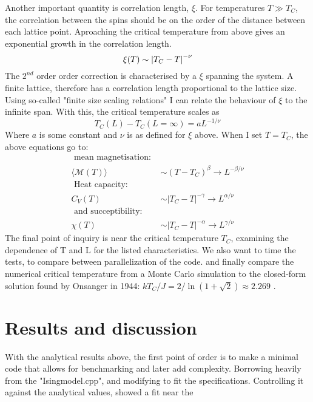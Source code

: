 \documentclass[10pt, twocolumn]{revtex4-1}
\begin{document}
Another important quantity is correlation length, $\xi$. For temperatures $T \gg T_C$, the correlation between the spins should be on the order of the
distance between each lattice point. Aproaching the critical temperature from above gives an exponential
growth in the correlation length.
\[ \xi(T) \sim \qty| T_C - T |^{-\nu} \]
The $2^{nd}$ order order correction is characterised by a $\xi$ spanning the system. A finite lattice, therefore has a correlation length proportional to
the lattice size. Using so-called "finite size scaling relations" I can relate the behaviour of $\xi$ to the infinite span. With this, the critical
temperature scales as
\[ T _ { C } ( L ) - T _ { C } ( L = \infty ) = a L ^ { - 1 / \nu } \]
Where $a$ is some constant and $\nu$ is as defined for $\xi$ above. When I set $T = T_C$, the above equations go to:
\begin{align*}
    \text{ mean magnetisation: } \\
    \langle \mathcal { M } ( T ) \rangle &\sim \left( T - T _ { C } \right) ^ { \beta } \rightarrow L ^ { - \beta / \nu }\\
    \text{ Heat capacity: } \\
    C _ { V } ( T ) &\sim \left| T _ { C } - T \right| ^ { - \gamma } \rightarrow L ^ { \alpha / \nu }\\
    \text{ and succeptibility: } \\
    \chi ( T ) &\sim \left| T _ { C } - T \right| ^ { - \alpha } \rightarrow L ^ { \gamma / \nu }
\end{align*}
The final point of inquiry is near the critical temperature $T_C$, examining the dependence of T and L for the listed characteristics.
We also want to time the tests, to compare between parallelization of the code. and finally compare the numerical critical temperature from a Monte Carlo
simulation to the closed-form solution found by Onsanger in 1944: $k T _ { C } / J = 2 / \ln ( 1 + \sqrt { 2 } ) \approx 2.269$ \cite{PhysRev.65.117}.



\section{Results and discussion}

With the analytical results above, the first point of order is to make a minimal code that allows for benchmarking and later add complexity. Borrowing
heavily from the "Isingmodel.cpp"\cite{MortenIsingmodel}, and modifying to fit the specifications. Controlling it against the analytical values, showed a fit
near the
\end{document}
